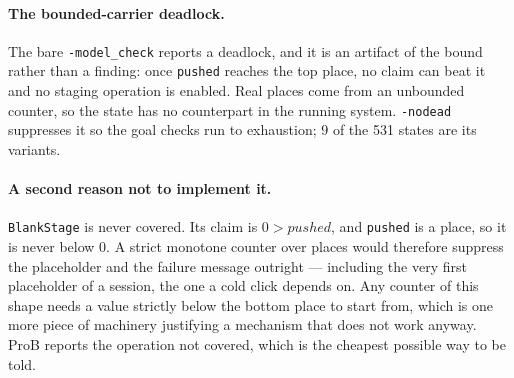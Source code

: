 \documentclass[a4paper,10pt,fleqn]{article}
\begin{document}
\paragraph{The bounded-carrier deadlock.}
The bare \texttt{-model\_check} reports a deadlock, and it is an artifact of
the bound rather than a finding: once \texttt{pushed} reaches the top place, no
claim can beat it and no staging operation is enabled. Real places come from an
unbounded counter, so the state has no counterpart in the running system.
\texttt{-nodead} suppresses it so the goal checks run to exhaustion; 9 of the
531 states are its variants.

\paragraph{A second reason not to implement it.}
\texttt{BlankStage} is never covered. Its claim is $0 > pushed$, and
\texttt{pushed} is a place, so it is never below $0$. A strict monotone counter
over places would therefore suppress the placeholder and the failure message
outright --- including the very first placeholder of a session, the one a cold
click depends on. Any counter of this shape needs a value strictly below the
bottom place to start from, which is one more piece of machinery justifying a
mechanism that does not work anyway. ProB reports the operation not covered,
which is the cheapest possible way to be told.
\end{document}
